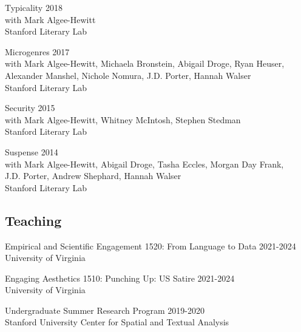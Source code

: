 \documentclass[
  12pt,
  letterpaper,
]{article}
\begin{document}
Typicality \hfill 2018\\
\hspace*{0.333em} with Mark Algee-Hewitt\\
\hspace*{0.333em} Stanford Literary Lab

Microgenres \hfill 2017\\
\hspace*{0.333em} with Mark Algee-Hewitt, Michaela Bronstein, Abigail
Droge, Ryan Heuser,\\
\hspace*{0.333em} Alexander Manshel, Nichole Nomura, J.D. Porter, Hannah
Walser\\
\hspace*{0.333em} Stanford Literary Lab

Security \hfill 2015\\
\hspace*{0.333em} with Mark Algee-Hewitt, Whitney McIntosh, Stephen
Stedman\\
\hspace*{0.333em} Stanford Literary Lab

Suspense \hfill 2014\\
\hspace*{0.333em} with Mark Algee-Hewitt, Abigail Droge, Tasha Eccles,
Morgan Day Frank,\\
\hspace*{0.333em} J.D. Porter, Andrew Shephard, Hannah Walser\\
\hspace*{0.333em} Stanford Literary Lab

\hypertarget{teaching}{%
\subsection{Teaching}\label{teaching}}

Empirical and Scientific Engagement 1520: From Language to Data
\hfill 2021-2024\\
\hspace*{0.333em} University of Virginia

Engaging Aesthetics 1510: Punching Up: US Satire \hfill 2021-2024\\
\hspace*{0.333em} University of Virginia

Undergraduate Summer Research Program \hfill 2019-2020\\
\hspace*{0.333em} Stanford University Center for Spatial and Textual
Analysis
\end{document}
